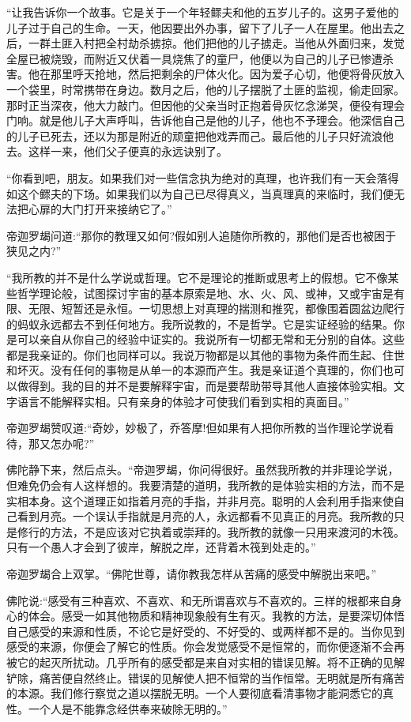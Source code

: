 \documentclass[12pt,twoside,openany]{book}
\begin{document}
“让我告诉你一个故事。它是关于一个年轻鳏夫和他的五岁儿子的。这男子爱他的儿子过于自己的生命。一天，他因要出外办事，留下了儿子一人在屋里。他出去之后，一群土匪入村把全村劫杀掳掠。他们把他的儿子掳走。当他从外面归来，发觉全屋已被烧毁，而附近又伏着一具烧焦了的童尸，他便以为自己的儿子已惨遭杀害。他在那里呼天抢地，然后把剩余的尸体火化。因为爱子心切，他便将骨灰放入一个袋里，时常携带在身边。数月之后，他的儿子摆脱了土匪的监视，偷走回家。那时正当深夜，他大力敲门。但因他的父亲当时正抱着骨灰忆念涕哭，便役有理会门响。就是他儿子大声呼叫，告诉他自己是他的儿子，他也不予理会。他深信自己的儿子已死去，还以为那是附近的顽童把他戏弄而己。最后他的儿子只好流浪他去。这样一来，他们父子便真的永远诀别了。

“你看到吧，朋友。如果我们对一些信念执为绝对的真理，也许我们有一天会落得如这个鳏夫的下场。如果我们以为自己已尽得真义，当真理真的来临时，我们便无法把心扉的大门打开来接纳它了。”

帝迦罗朅问道:“那你的教理又如何?假如别人追随你所教的，那他们是否也被困于狭见之内?”

“我所教的并不是什么学说或哲理。它不是理论的推断或思考上的假想。它不像某些哲学理论般，试图探讨宇宙的基本原索是地、水、火、风、或神，又或宇宙是有限、无限、短暂还是永恒。一切思想上对真理的揣测和推究，都像围着圆盆边爬行的蚂蚁永远都去不到任何地方。我所说教的，不是哲学。它是实证经验的结果。你是可以亲自从你自己的经验中证实的。我说所有一切都无常和无分别的自体。这些都是我亲证的。你们也同样可以。我说万物都是以其他的事物为条件而生起、住世和坏灭。没有任何的事物是从单一的本源而产生。我是亲证道个真理的，你们也可以做得到。我的目的并不是要解释宇宙，而是要帮助带导其他人直接体验实相。文字语言不能解释实相。只有亲身的体验才可使我们看到实相的真面目。”

帝迦罗朅赞叹道:“奇妙，妙极了，乔答摩!但如果有人把你所教的当作理论学说看待，那又怎办呢?”

佛陀静下来，然后点头。“帝迦罗朅，你问得很好。虽然我所教的并非理论学说，但难免仍会有人这样想的。我要清楚的道明，我所教的是体验实相的方法，而不是实相本身。这个道理正如指着月亮的手指，并非月亮。聪明的人会利用手指来使自己看到月亮。一个误认手指就是月亮的人，永远都看不见真正的月亮。我所教的只是修行的方法，不是应该对它执着或崇拜的。我所教的就像一只用来渡河的木筏。只有一个愚人才会到了彼岸，解脱之岸，还背着木筏到处走的。”

帝迦罗朅合上双掌。“佛陀世尊，请你教我怎样从苦痛的感受中解脱出来吧。”

佛陀说:“感受有三种喜欢、不喜欢、和无所谓喜欢与不喜欢的。三样的根都来自身心的体会。感受一如其他物质和精神现象般有生有灭。我教的方法，是要深切体悟自己感受的来源和性质，不论它是好受的、不好受的、或两样都不是的。当你见到感受的来源，你便会了解它的性质。你会发觉感受不是恒常的，而你便逐渐不会再被它的起灭所扰动。几乎所有的感受都是来自对实相的错误见解。将不正确的见解铲除，痛苦便自然终止。错误的见解使人把不恒常的当作恒常。无明就是所有痛苦的本源。我们修行察觉之道以摆脱无明。一个人要彻底看清事物才能洞悉它的真性。一个人是不能靠念经供奉来破除无明的。”
\end{document}
